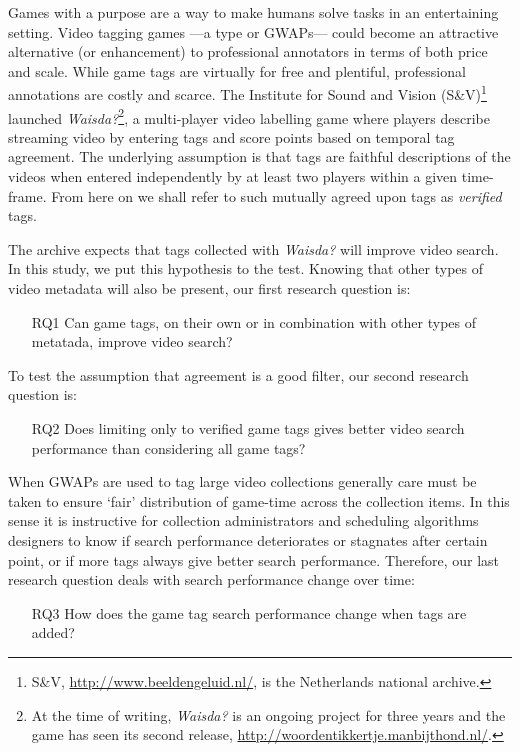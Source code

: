 Games with a purpose are a way to make humans solve tasks in an entertaining setting. Video tagging games ---a type or GWAPs---	
could become an attractive alternative (or enhancement) to professional annotators in terms of both price and scale. While game tags are virtually for free and plentiful, professional annotations are costly and scarce.
The Institute for Sound and Vision (S\&V)\footnote{S\&V, \url{http://www.beeldengeluid.nl/}, is the Netherlands national archive.} launched \textit{Waisda?}\footnote{At the time of writing, \textit{Waisda?} is an ongoing project for three years and the game has seen its second release, \url{http://woordentikkertje.manbijthond.nl/}.}, a multi-player video labelling game where players describe streaming video by entering tags and score points based on temporal tag agreement.  The underlying assumption is that tags are faithful descriptions of the videos when entered independently by at least two players within a given time-frame.  From here on we shall refer to such mutually agreed upon tags as \textit{verified} tags.

The archive expects that tags collected with \textit{Waisda?} will improve video search. In this study, we put this hypothesis to the test.
Knowing that other types of video metadata will also be present, our first research question is:
\begin{itemize}
\item[RQ1] Can game tags, on their own or in combination with other types of metatada, improve video search?
\end{itemize}
To test the assumption that agreement is a good filter,  our second research question is:
\begin{itemize}
\item[RQ2] Does limiting only to verified game tags gives better video search performance than considering all game tags?
\end{itemize}
When GWAPs are used to tag large video collections generally care must be taken to ensure `fair' distribution of game-time across the collection items. In this sense it is instructive for collection administrators and scheduling algorithms designers to know if search performance deteriorates or stagnates after certain point, or if more tags always give better search performance. Therefore, our last research question deals with search performance change over time:
\begin{itemize}
\item[RQ3] How does the game tag search performance change when tags are added?
\end{itemize}

